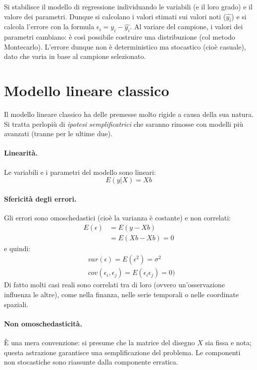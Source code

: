 \documentclass[11pt, twocolumn]{article}
\begin{document}
Si stabilisce il modello di regressione individuando le variabili (e il loro grado) e il valore dei parametri.
Dunque si calcolano i valori stimati sui valori noti ($\hat{y_i}$) e si calcola l'errore con la formula $\epsilon_i = y_i - \hat{y_i}$.
Al variare del campione, i valori dei parametri cambiano: è così possibile costruire una distribuzione (col metodo Montecarlo).
L'errore dunque non è deterministico ma stocastico (cioè casuale), dato che varia in base al campione selezionato.

\newpage
\part{Modello lineare classico}
Il modello lineare classico ha delle premesse molto rigide a causa della sua natura.
Si tratta perlopiù di \textit{ipotesi semplificatrici} che saranno rimosse con modelli più avanzati (tranne per le ultime due).

\subsection*{Linearità.}
Le variabili e i parametri del modello sono lineari:
\begin{equation*}
  E(y | X) = Xb
\end{equation*}

\subsection*{Sfericità degli errori.}
Gli errori sono omoschedastici (cioè la varianza è costante) e non correlati:
\begin{align*}
  E(\epsilon) &= E(y - Xb) \\
              &= E(Xb - Xb) = 0
\end{align*}
e quindi:
\begin{align*}
  &var(\epsilon) = E(\epsilon^2) = \sigma^2 \\
  &cov(\epsilon_i, \epsilon_j) = E(\epsilon_i\epsilon_j) = 0)
\end{align*}
Di fatto molti casi reali sono correlati tra di loro (ovvero un'osservazione influenza le altre), come nella finanza, nelle serie temporali o nelle coordinate spaziali.

\subsection*{Non omoschedasticità.}
È una mera convenzione: si presume che la matrice del disegno $X$ sia fissa e nota; questa astrazione garantisce una semplificazione del problema.
Le componenti non stocastiche sono riassunte dalla componente erratica.
\end{document}
